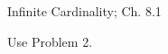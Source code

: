 \documentclass[handout]{mcs}
\begin{document}


\begin{staffnotes}
	Infinite Cardinality;  Ch. 8.1
\end{staffnotes}

\hint Use Problem 2.



\end{document}
